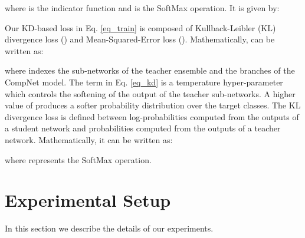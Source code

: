 \documentclass{ecai}
\begin{document}
where  is the indicator function and  is the SoftMax operation. It is given by: 
 
Our KD-based loss  in Eq. \ref{eq_train} is composed of Kullback-Leibler (KL) divergence loss () and Mean-Squared-Error loss ().
Mathematically,  can be written as:

where  indexes the sub-networks of the teacher ensemble and the branches of the CompNet model. The term  in Eq. \ref{eq_kd} is a temperature hyper-parameter which controls the softening of the output of the teacher sub-networks. A higher value of  produces a softer probability distribution over the target classes.
The KL divergence loss  is defined between log-probabilities computed from the outputs of a student network and probabilities computed from the outputs of a teacher network. Mathematically, it can be written as: 

where  represents the SoftMax operation.
\section{Experimental Setup}\label{implementation}
In this section we describe the details of our experiments.
\end{document}
